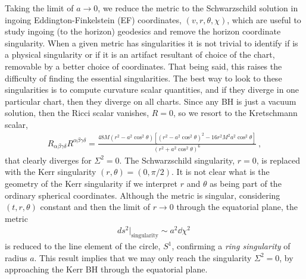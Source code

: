 Taking the limit of $a\to0$, we reduce the metric to the Schwarzschild solution in ingoing Eddington-Finkelstein (EF) coordinates, $(v,r,\theta,\chi)$, which are useful to study ingoing (to the horizon) geodesics and remove the horizon coordinate singularity.
When a given metric has singularities it is not trivial to identify if is a physical singularity or if it is an artifact resultant of choice of the chart, removable by a better choice of coordinates. 
That being said, this raises the difficulty of finding the essential singularities.
The best way to look to these singularities is to compute curvature scalar quantities, and if they diverge in one particular chart, then they diverge on all charts.
Since any BH is just a vacuum solution, then the Ricci scalar vanishes, $R=0$, so we resort to the Kretschmann scalar,
\begin{align}
    R_{\alpha\beta\gamma\delta} R^{\alpha\beta\gamma\delta} = \frac{48 M (r^2 - a^2\cos^2\theta) \left[ (r^2 - a^2\cos^2\theta) ^2 - 16 r^2 M^2 a^2\cos^2\theta \right] }{(r^2 + a^2\cos^2\theta)^6} ~,
    \label{eq2:KerrKretschmann}
\end{align}
that clearly diverges for $\Sigma^2=0$.
The Schwarzschild singularity, $r=0$, is replaced with the Kerr singularity $(r,\theta)=(0,\pi/2)$.
It is not clear what is the geometry of the Kerr singularity if we interpret $r$ and $\theta$ as being part of the ordinary spherical coordinates.
Although the metric is singular, considering $(t,r,\theta)$ constant and then the limit of $r\to0$ through the equatorial plane, the metric
\begin{align}
    {ds^2}\rvert_{\mathrm{singularity}} \sim a^2 \dd \chi^2 ~
    \label{eq2:KerrKretschmann}
\end{align}
is reduced to the line element of the circle, $S^1$, confirming a \emph{ring singularity} of radius $a$.
This result implies that we may only reach the singularity $\Sigma^2=0$, by approaching the Kerr BH through the equatorial plane. 

